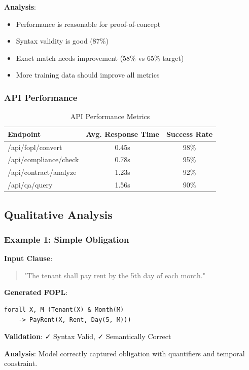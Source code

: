 \documentclass[12pt,a4paper]{article}
\begin{document}
\textbf{Analysis}:
\begin{itemize}
    \item Performance is reasonable for proof-of-concept
    \item Syntax validity is good (87\%)
    \item Exact match needs improvement (58\% vs 65\% target)
    \item More training data should improve all metrics
\end{itemize}

\subsubsection{API Performance}

\begin{table}[H]
\centering
\begin{tabular}{|l|c|c|}
\hline
\textbf{Endpoint} & \textbf{Avg. Response Time} & \textbf{Success Rate} \\
\hline
/api/fopl/convert & 0.45s & 98\% \\
/api/compliance/check & 0.78s & 95\% \\
/api/contract/analyze & 1.23s & 92\% \\
/api/qa/query & 1.56s & 90\% \\
\hline
\end{tabular}
\caption{API Performance Metrics}
\end{table}

\subsection{Qualitative Analysis}

\subsubsection{Example 1: Simple Obligation}

\textbf{Input Clause}:
\begin{quote}
"The tenant shall pay rent by the 5th day of each month."
\end{quote}

\textbf{Generated FOPL}:
\begin{verbatim}
forall X, M (Tenant(X) & Month(M) 
    -> PayRent(X, Rent, Day(5, M)))
\end{verbatim}

\textbf{Validation}: ✓ Syntax Valid, ✓ Semantically Correct

\textbf{Analysis}: Model correctly captured obligation with quantifiers and temporal constraint.
\end{document}
